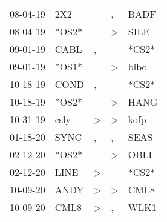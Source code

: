 \begin{supertabular}{p{0.07\textwidth}p{0.06\textwidth}p{0.02\textwidth}p{0.02\textwidth}p{0.06\textwidth}}
          08-04-19\textsuperscript{} &            2X2\textsuperscript{} &                  &                , &           BADF\textsuperscript{} \\
          08-04-19\textsuperscript{} &                            *OS2* &                  &     \textgreater &           SILE\textsuperscript{} \\
          09-01-19\textsuperscript{} &           CABL\textsuperscript{} &                , &                  &                            *CS2* \\
          09-01-19\textsuperscript{} &                            *OS1* &                  &     \textgreater &           blbc\textsuperscript{} \\
          10-18-19\textsuperscript{} &           COND\textsuperscript{} &                , &                  &                            *CS2* \\
          10-18-19\textsuperscript{} &                            *OS2* &                  &     \textgreater &           HANG\textsuperscript{} \\
          10-31-19\textsuperscript{} &           csly\textsuperscript{} &     \textgreater &     \textgreater &           kofp\textsuperscript{} \\
          01-18-20\textsuperscript{} &           SYNC\textsuperscript{} &                , &                , &           SEAS\textsuperscript{} \\
          02-12-20\textsuperscript{} &                            *OS2* &                  &     \textgreater &           OBLI\textsuperscript{} \\
          02-12-20\textsuperscript{} &           LINE\textsuperscript{} &     \textgreater &                  &                            *CS2* \\
          10-09-20\textsuperscript{} &           ANDY\textsuperscript{} &     \textgreater &     \textgreater &           CML8\textsuperscript{} \\
          10-09-20\textsuperscript{} &           CML8\textsuperscript{} &     \textgreater &                , &           WLK1\textsuperscript{} \\
\end{supertabular}

